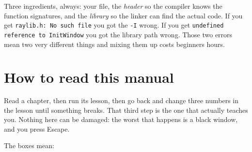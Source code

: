 Three ingredients, always: your  file, the \emph{header} so the compiler
knows the function signatures, and the \emph{library} so the linker can find the
actual code. If you get \lstinline|raylib.h: No such file| you got the
\lstinline|-I| wrong. If you get \lstinline|undefined reference to InitWindow|
you got the library path wrong. Those two errors mean two very different things
and mixing them up costs beginners hours.


\section{How to read this manual}

Read a chapter, then run its lesson, then go back and change three numbers in the
lesson until something breaks. That third step is the one that actually teaches
you. Nothing here can be damaged: the worst that happens is a black window, and
you press Escape.

The boxes mean:




